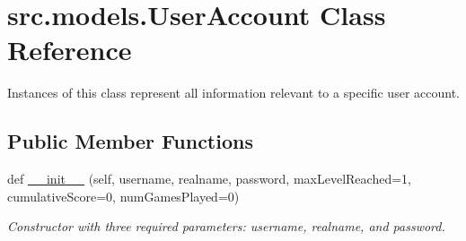 \hypertarget{classsrc_1_1models_1_1_user_account}{}\section{src.\+models.\+User\+Account Class Reference}
\label{classsrc_1_1models_1_1_user_account}


Instances of this class represent all information relevant to a specific user account.  


\subsection*{Public Member Functions}
\begin{DoxyCompactItemize}
\item 
def \hyperlink{classsrc_1_1models_1_1_user_account_a027838850b725021534e05b2efffdc8f}{\+\_\+\+\_\+init\+\_\+\+\_\+} (self, username, realname, password, max\+Level\+Reached=1, cumulative\+Score=0, num\+Games\+Played=0)
\begin{DoxyCompactList}\small\item\em Constructor with three required parameters\+: username, realname, and password. \end{DoxyCompactList}\end{DoxyCompactItemize}

